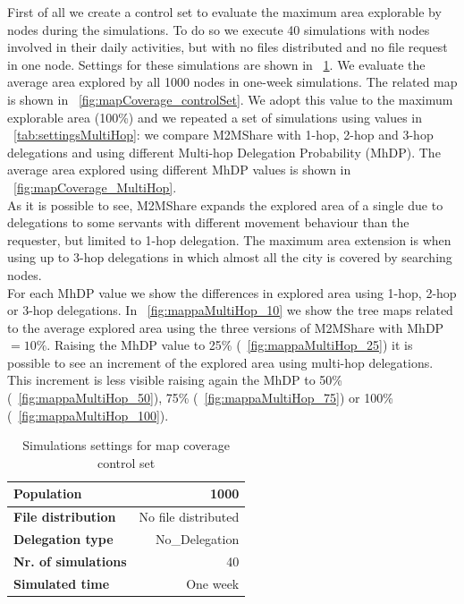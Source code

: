 First of all we create a control set to evaluate the maximum area explorable by nodes during the simulations. To do so we execute 40 simulations with nodes involved in their daily activities, but with no files distributed and no file request in one node. Settings for these simulations are shown in \tablename~\ref{tab:settingsControlSet}. We evaluate the average area explored by all 1000 nodes in one-week simulations. The related map is shown in  \figurename~\ref{fig:mapCoverage_controlSet}. We adopt this value to the maximum explorable area (100\%) and we repeated a set of simulations using values in \tablename~\ref{tab:settingsMultiHop}: we compare M2MShare with 1-hop, 2-hop and 3-hop delegations and using different Multi-hop Delegation Probability (MhDP). The average area explored using different MhDP values is shown in \figurename~\ref{fig:mapCoverage_MultiHop}.
\\
As it is possible to see, M2MShare expands the explored area of a single due to delegations to some servants with different movement behaviour than the requester, but limited to 1-hop delegation. The maximum area extension is when using up to 3-hop delegations in which almost all the city is covered by searching nodes.
\\

For each MhDP value we show the differences in explored area using 1-hop, 2-hop or 3-hop delegations. In \figurename~\ref{fig:mappaMultiHop_10} we show the tree maps related to the average explored area using the three versions of M2MShare with MhDP~$= 10\%$. Raising the MhDP value to 25\% (\figurename~\ref{fig:mappaMultiHop_25}) it is possible to see an increment of the explored area using multi-hop delegations. This increment is less visible raising again the MhDP to 50\% (\figurename~\ref{fig:mappaMultiHop_50}), 75\% (\figurename~\ref{fig:mappaMultiHop_75}) or 100\% (\figurename~\ref{fig:mappaMultiHop_100}).   

\begin{table}[htpb]
\begin{center}
\begin{tabular}[width=4cm]{|l|r|}
\hline
\bfseries Population & 1000 \\
\hline
\bfseries File distribution & No file distributed \\
\hline
\bfseries Delegation type & No\_Delegation \\
\hline
\bfseries Nr. of simulations & 40\\
\hline
\bfseries Simulated time & One week \\
\hline
\end{tabular}
\end{center}
\caption{Simulations settings for map coverage control set\label{tab:settingsControlSet}}
\end{table}

